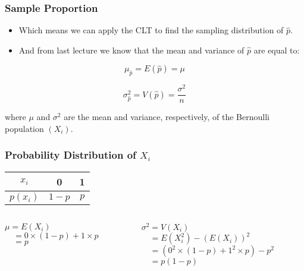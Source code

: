 \documentclass[14pt]{beamer}
\begin{document}
\begin{frame}
	\frametitle{Sample Proportion}
	
	\begin{itemize}[label={\color{blue}$\blacktriangleright$}]
		\item Which means we can apply the CLT to find the sampling distribution of $\hat{p}$.
		\item And from last lecture we know that the mean and variance of $\hat{p}$ are equal to:
	\end{itemize}
	
	\vspace{0.5em}
	
	\[
	\mu_{\hat{p}} = E(\hat{p}) = \mu
	\]
	
	\[
	\sigma_{\hat{p}}^2 = V(\hat{p}) = \frac{\sigma^2}{n}
	\]
	
	\vspace{0.5em}
	
	where $\mu$ and $\sigma^2$ are the mean and variance, respectively, of the Bernoulli population $(X_i)$.
	
\end{frame}
\begin{frame}
	\frametitle{Probability Distribution of $X_i$}
	
	\begin{center}
		\begin{tabular}{ccc}
			\toprule
			$x_i$ & 0 & 1 \\
			\midrule
			$p(x_i)$ & $1-p$ & $p$ \\
			\bottomrule
		\end{tabular}
	\end{center}
	
	\vspace{1cm}
	
	\begin{columns}[T]
		\begin{column}{0.5\textwidth}
			$\mu = E(X_i)$ \\
			$\quad = 0 \times (1-p) + 1 \times p$ \\
			$\quad = p$
		\end{column}
		\begin{column}{0.5\textwidth}
			$\sigma^2 = V(X_i)$ \\
			$\quad = E(X_i^2) - (E(X_i))^2$ \\
			$\quad = (0^2 \times (1-p) + 1^2 \times p) - p^2$ \\
			$\quad = p(1-p)$
		\end{column}
	\end{columns}
	
\end{frame}
\end{document}
